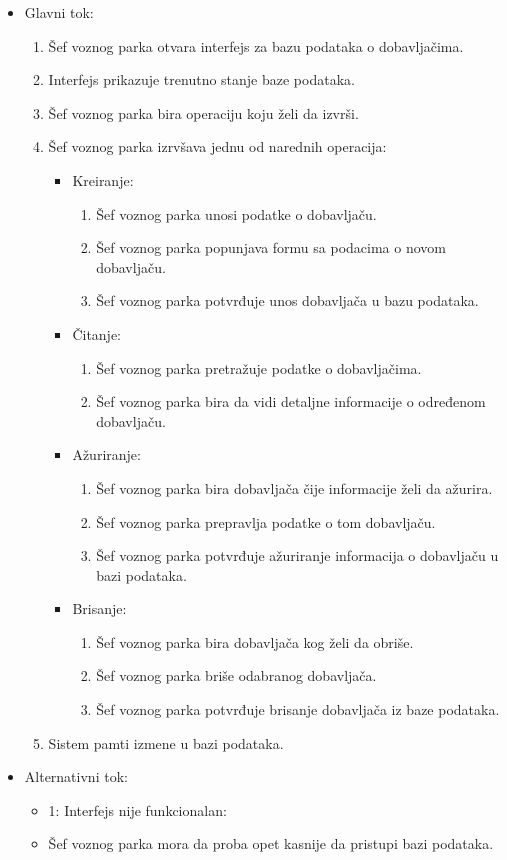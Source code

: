 \begin{itemize}
	\item Glavni tok:
		\begin{enumerate}
		    \item Šef voznog parka otvara interfejs za bazu podataka o dobavljačima.
		    \item Interfejs prikazuje trenutno stanje baze podataka.
		    \item Šef voznog parka bira operaciju koju želi da izvrši.
			\item Šef voznog parka izrvšava jednu od narednih operacija:
			\begin{itemize}
    \item Kreiranje:
    \begin{enumerate}
        \item Šef voznog parka unosi podatke o dobavljaču.
        \item Šef voznog parka popunjava formu sa podacima o novom dobavljaču.
        \item Šef voznog parka potvrđuje unos dobavljača u bazu podataka.
    \end{enumerate}
    \item Čitanje:
    \begin{enumerate}
        \item Šef voznog parka pretražuje podatke o dobavljačima.
        \item Šef voznog parka bira da vidi detaljne informacije o određenom dobavljaču.
    \end{enumerate}
    \item Ažuriranje:
    \begin{enumerate}
        \item Šef voznog parka bira dobavljača čije informacije želi da ažurira.
        \item Šef voznog parka prepravlja podatke o tom dobavljaču.
        \item Šef voznog parka potvrđuje ažuriranje informacija o dobavljaču u bazi podataka.
    \end{enumerate}
    \item Brisanje:
    \begin{enumerate}
        \item Šef voznog parka bira dobavljača kog želi da obriše.
        \item Šef voznog parka briše odabranog dobavljača.
        \item Šef voznog parka potvrđuje brisanje dobavljača iz baze podataka.
    \end{enumerate}
\end{itemize}
		\item Sistem pamti izmene u bazi podataka.
		\end{enumerate}

	\item Alternativni tok:
		\begin{itemize}
		    \item 1: Interfejs nije funkcionalan:
			\item Šef voznog parka mora da proba opet kasnije da pristupi bazi podataka.
		\end{itemize}

\end{itemize}



